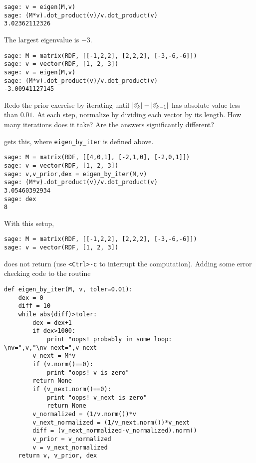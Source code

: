 \begin{exercises}
\begin{answer}
\begin{exparts}
\begin{lstlisting}
sage: v = eigen(M,v)
sage: (M*v).dot_product(v)/v.dot_product(v)
3.02362112326
\end{lstlisting}
       \partsitem The largest eigenvalue is $-3$.
\begin{lstlisting}
sage: M = matrix(RDF, [[-1,2,2], [2,2,2], [-3,-6,-6]])
sage: v = vector(RDF, [1, 2, 3])
sage: v = eigen(M,v)
sage: (M*v).dot_product(v)/v.dot_product(v)
-3.00941127145
\end{lstlisting}
     \end{exparts}
    \end{answer}
  \item 
     Redo the prior exercise by iterating until 
     $\lvert\vec{v}_k\rvert-\lvert\vec{v}_{k-1}\rvert$ has absolute value less than
     $0.01$.
     At each step, normalize by dividing each vector by its length.
     How many iterations does it take?
     Are the answers significantly different?
     \begin{answer}
       \begin{exparts}
         \partsitem
           \Sage{} gets this, where \lstinline!eigen_by_iter! is defined
           above.
\begin{lstlisting}
sage: M = matrix(RDF, [[4,0,1], [-2,1,0], [-2,0,1]])
sage: v = vector(RDF, [1, 2, 3])
sage: v,v_prior,dex = eigen_by_iter(M,v) 
sage: (M*v).dot_product(v)/v.dot_product(v)
3.05460392934
sage: dex
8            
\end{lstlisting}
         \partsitem With this setup, 
\begin{lstlisting}
sage: M = matrix(RDF, [[-1,2,2], [2,2,2], [-3,-6,-6]])
sage: v = vector(RDF, [1, 2, 3])       
\end{lstlisting}
            \Sage{} does not return (use \lstinline!<Ctrl>-c! to interrupt the
            computation).
            Adding some error checking code to the routine 
\begin{lstlisting}
def eigen_by_iter(M, v, toler=0.01):
    dex = 0
    diff = 10
    while abs(diff)>toler:
        dex = dex+1
        if dex>1000:
            print "oops! probably in some loop: \nv=",v,"\nv_next=",v_next
        v_next = M*v
        if (v.norm()==0):
            print "oops! v is zero"
	    return None
        if (v_next.norm()==0):
            print "oops! v_next is zero"
            return None
        v_normalized = (1/v.norm())*v
        v_next_normalized = (1/v_next.norm())*v_next
        diff = (v_next_normalized-v_normalized).norm()
        v_prior = v_normalized
        v = v_next_normalized
    return v, v_prior, dex              

\end{lstlisting}
\end{exparts}
\end{answer}
\end{exercises}
